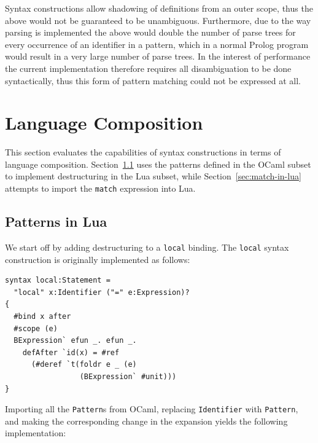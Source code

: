 \documentclass{kththesis}
\begin{document}
Syntax constructions allow shadowing of definitions from an outer scope, thus the above would not be guaranteed to be unambiguous. Furthermore, due to the way parsing is implemented the above would double the number of parse trees for every occurrence of an identifier in a pattern, which in a normal Prolog program would result in a very large number of parse trees. In the interest of performance the current implementation therefore requires all disambiguation to be done syntactically, thus this form of pattern matching could not be expressed at all.



\section{Language Composition} \label{sec:language-composition}

This section evaluates the capabilities of syntax constructions in terms of language composition. Section~\ref{sec:patterns-in-lua} uses the patterns defined in the OCaml subset to implement destructuring in the Lua subset, while Section~\ref{sec:match-in-lua} attempts to import the \texttt{match} expression into Lua.

\subsection{Patterns in Lua} \label{sec:patterns-in-lua}

We start off by adding destructuring to a \texttt{local} binding. The \texttt{local} syntax construction is originally implemented as follows:

\begin{verbatim}
syntax local:Statement =
  "local" x:Identifier ("=" e:Expression)?
{
  #bind x after
  #scope (e)
  BExpression` efun _. efun _.
    defAfter `id(x) = #ref
      (#deref `t(foldr e _ (e)
                 (BExpression` #unit)))
}
\end{verbatim}

Importing all the \texttt{Pattern}s from OCaml, replacing \texttt{Identifier} with \texttt{Pattern}, and making the corresponding change in the expansion yields the following implementation:
\end{document}
